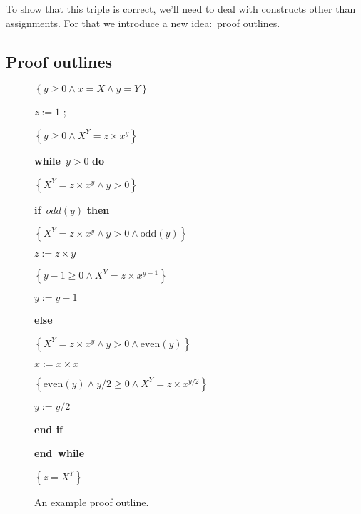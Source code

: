 \documentclass[11pt]{article}%
\begin{document}
To show that this triple is correct, we'll need to deal with constructs other
than assignments. For that we introduce a new idea:\ proof outlines.

\subsection{Proof outlines}%

\begin{figure}[tb]%


\begin{code}
$\left\{  y\geq0\wedge x=X\wedge y=Y\right\}  $

$z:=1$ ;

$\left\{  y\geq0\wedge X^{Y}=z\times x^{y}\right\}  $

\textbf{while}\ $y>0$ \textbf{do}

\begin{indent}
\item $\left\{  X^{Y}=z\times x^{y}\wedge y>0\right\}  $

\item \textbf{if}\ \textrm{$odd$}$(y)$ \textbf{then}

\begin{indent}
\item $\left\{  X^{Y}=z\times x^{y}\wedge y>0\wedge\mathrm{odd}(y)\right\}  $

\item $z:=z\times y$

\item $\left\{  y-1\geq0\wedge X^{Y}=z\times x^{y-1}\right\}  $

\item $y:=y-1$
\end{indent}

\item \textbf{else}

\begin{indent}
\item $\left\{  X^{Y}=z\times x^{y}\wedge y>0\wedge\mathrm{even}(y)\right\}  $

\item $x:=x\times x$

\item $\left\{  \mathrm{even}(y)\wedge y/2\geq0\wedge X^{Y}=z\times
x^{y/2}\right\}  $

\item $y:=y/2$
\end{indent}

\item \textbf{end if}
\end{indent}

\thinspace\textbf{end\ while}

$\left\{  z=X^{Y}\right\}  $
\end{code}

%

\caption{An example proof outline.}\label{po}\end{figure}%
\end{document}
